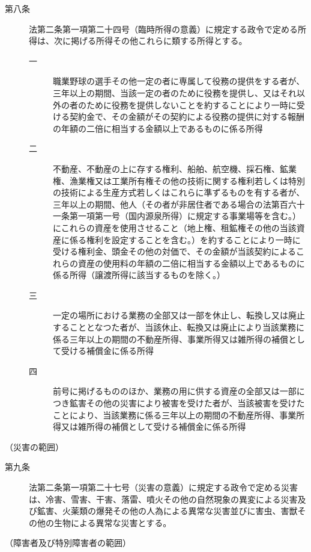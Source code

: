 \documentclass[twocolumn,a4j,10pt]{ltjtarticle}
\begin{document}
\begin{description}
\item[第八条]法第二条第一項第二十四号（臨時所得の意義）に規定する政令で定める所得は、次に掲げる所得その他これらに類する所得とする。
\begin{description}
\item[一]職業野球の選手その他一定の者に専属して役務の提供をする者が、三年以上の期間、当該一定の者のために役務を提供し、又はそれ以外の者のために役務を提供しないことを約することにより一時に受ける契約金で、その金額がその契約による役務の提供に対する報酬の年額の二倍に相当する金額以上であるものに係る所得
\item[二]不動産、不動産の上に存する権利、船舶、航空機、採石権、鉱業権、漁業権又は工業所有権その他の技術に関する権利若しくは特別の技術による生産方式若しくはこれらに準ずるものを有する者が、三年以上の期間、他人（その者が非居住者である場合の法第百六十一条第一項第一号（国内源泉所得）に規定する事業場等を含む。）にこれらの資産を使用させること（地上権、租鉱権その他の当該資産に係る権利を設定することを含む。）を約することにより一時に受ける権利金、頭金その他の対価で、その金額が当該契約によるこれらの資産の使用料の年額の二倍に相当する金額以上であるものに係る所得（譲渡所得に該当するものを除く。）
\item[三]一定の場所における業務の全部又は一部を休止し、転換し又は廃止することとなつた者が、当該休止、転換又は廃止により当該業務に係る三年以上の期間の不動産所得、事業所得又は雑所得の補償として受ける補償金に係る所得
\item[四]前号に掲げるもののほか、業務の用に供する資産の全部又は一部につき鉱害その他の災害により被害を受けた者が、当該被害を受けたことにより、当該業務に係る三年以上の期間の不動産所得、事業所得又は雑所得の補償として受ける補償金に係る所得
\end{description}
\end{description}
\noindent\hspace{10pt}（災害の範囲）
\begin{description}
\item[第九条]法第二条第一項第二十七号（災害の意義）に規定する政令で定める災害は、冷害、雪害、干害、落雷、噴火その他の自然現象の異変による災害及び鉱害、火薬類の爆発その他の人為による異常な災害並びに害虫、害獣その他の生物による異常な災害とする。
\end{description}
\noindent\hspace{10pt}（障害者及び特別障害者の範囲）
\end{document}
